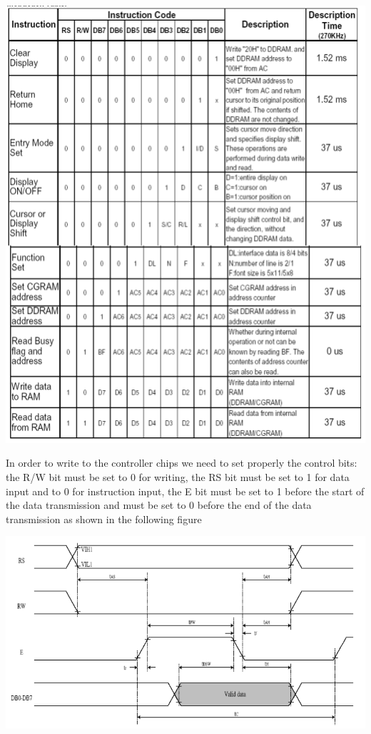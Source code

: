 \documentclass[]{article}
\begin{document}
\begin{center}
    \includegraphics[scale=0.7]{lcd_instruction}
\end{center}
In order to write to the controller chips we need to set properly the control bits: the R/W bit must be set to 0 for writing,
the RS bit must be set to 1 for data input and to 0 for instruction input, the E bit must be set to 1 before the start of the data transmission
and must be set to 0 before the end of the data transmission as shown in the following figure

\begin{center}
    \includegraphics[scale=0.5]{lcd_writing}
\end{center}
\end{document}
